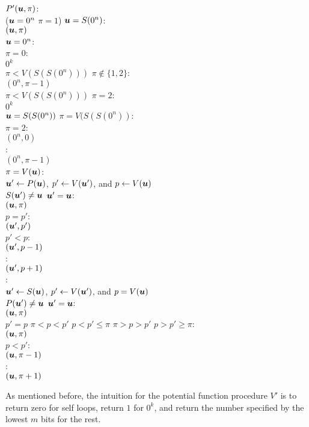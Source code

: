 \begin{algo}
\underline{$P'(\mbox{\boldmath $u$},\pi)$}:\+
\\\IfB ($\mbox{\boldmath $u$}=0^n$ \AndB $\pi=1$) \OrB $\mbox{\boldmath $u$}=S(0^n)$:\+
\\  \ReturnB $(\mbox{\boldmath $u$},\pi)$\-
\\\IfB $\mbox{\boldmath $u$}=0^n$:\+
\\  \IfB $\pi=0$:\+
\\    \ReturnB $0^k$\-
\\  \IfB $\pi<V(S(S(0^n)))$ \AndB $\pi\notin \{1,2\}$:\+
\\    \ReturnB $(0^n,\pi-1)$\-
\\  \IfB $\pi<V(S(S(0^n)))$ \AndB $\pi=2$:\+
\\    \ReturnB $0^k$\-\-
\\\IfB $\mbox{\boldmath $u$}=S(S(0^n))$ \AndB $\pi=V(S(S(0^n))$:\+
\\  \IfB $\pi=2$:\+
\\    \ReturnB $(0^n,0)$\-
\\  \ElseB:\+
\\    \ReturnB $(0^n,\pi-1)$\-\-
\\\IfB $\pi=V(\mbox{\boldmath $u$})$:\+
\\  $\mbox{\boldmath $u$}'\gets P(\mbox{\boldmath $u$})$, $p'\gets V(\mbox{\boldmath $u$}')$, and $p\gets V(\mbox{\boldmath $u$})$ 
\\  \IfB $S(\mbox{\boldmath $u$}')\neq \mbox{\boldmath $u$}$ \OrB $\mbox{\boldmath $u$}'=\mbox{\boldmath $u$}$:\+
\\    \ReturnB $(\mbox{\boldmath $u$},\pi)$\-
\\  \ElseIfB $p=p'$:\+
\\    \ReturnB $(\mbox{\boldmath $u$}',p')$ \-
\\  \ElseIfB $p'<p$:\+
\\    \ReturnB $(\mbox{\boldmath $u$}',p-1)$\-
\\  \ElseB:\+
\\    \ReturnB $(\mbox{\boldmath $u$}',p+1)$\-\-
\\\ElseB:\quad{}\+
\\  $\mbox{\boldmath $u$}'\gets S(\mbox{\boldmath $u$})$, $p'\gets V(\mbox{\boldmath $u$}')$, and $p=V(\mbox{\boldmath $u$})$
\\  \IfB $P(\mbox{\boldmath $u$}')\neq \mbox{\boldmath $u$}$ \OrB $\mbox{\boldmath $u$}'=\mbox{\boldmath $u$}$:\+
\\    \ReturnB $(\mbox{\boldmath $u$},\pi)$\-
\\  \ElseIfB $p'=p$ \OrB $\pi<p< p'$ \OrB $p<p'\le \pi$ \OrB $\pi>p> p'$ \OrB $p>p'\ge \pi$:\+
\\    \ReturnB $(\mbox{\boldmath $u$},\pi)$\-
\\  \ElseIfB $p<p'$:\quad{}\+
\\    \ReturnB $(\mbox{\boldmath $u$},\pi-1)$\-
\\  \ElseB:\quad{}\+
\\    \ReturnB $(\mbox{\boldmath $u$},\pi+1)$\-\-
\end{algo}
As mentioned before, the intuition for the potential function procedure $V'$ is to return zero for self loops, return $1$ for $0^k$, and return the number specified by the lowest $m$ bits for the rest. 


